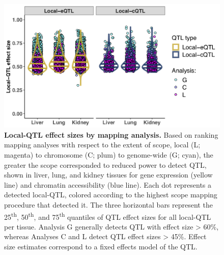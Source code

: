 \documentclass[9pt,twocolumn,twoside]{gsajnl}
\begin{document}
\begin{figure}[hp]
\renewcommand{\familydefault}{\sfdefault}\normalfont
\centering
\includegraphics[width=\textwidth, trim={0in 0in 0in 0in}, clip]{figs/local_qtl_effects.png}
\caption{\textbf{Local-QTL effect sizes by mapping analysis.} Based on ranking mapping analyses with respect to the extent of scope, local (L; magenta) to chromosome (C; plum) to genome-wide (G; cyan), the greater the scope corresponded to reduced power to detect QTL, shown in liver, lung, and kidney tissues for gene expression (yellow line) and chromatin accessibility (blue line). Each dot represents a detected local-QTL, colored according to the highest scope mapping procedure that detected it. The three horizontal bars represent the 25\textsuperscript{th}, 50\textsuperscript{th}, and 75\textsuperscript{th} quantiles of QTL effect sizes for all local-QTL per tissue. Analysis G generally detects QTL with effect size > 60\%, whereas Analyses C and L detect QTL effect sizes > 45\%. Effect size estimates correspond to a fixed effects model of the QTL.
\label{fig:qtl_effect_sizes_by_method}}
\end{figure}

\clearpage
\end{document}
